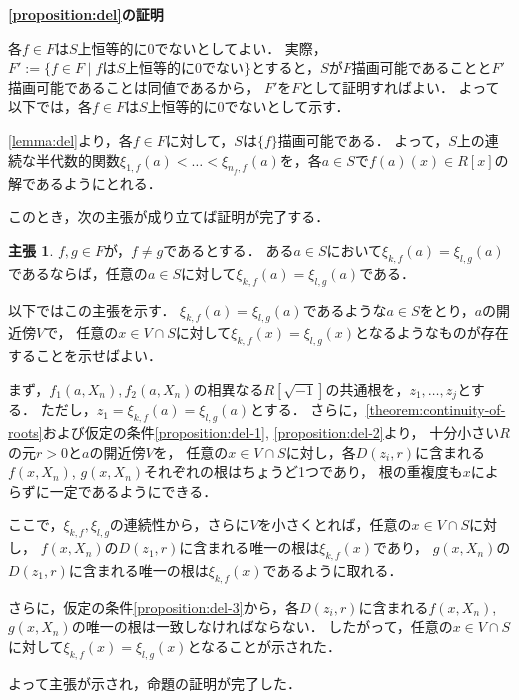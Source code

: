 \documentclass[uplatex, dvipdfmx]{jsarticle}
\makeatletter
\numberwithin{equation}{section}
\renewenvironment{proof}[1][\proofname]{\par
  \pushQED{\qed}%
  \normalfont \topsep6\p@\@plus6\p@\relax
  \trivlist
  \item\relax
  {\bfseries
  #1\@addpunct{.}}\hspace\labelsep\ignorespaces
}{
  \popQED\endtrivlist\@endpefalse
}
\theoremstyle{definition}
\newtheorem*{claim*}{主張}
\renewcommand{\proofname}{\textbf{証明}}
\makeatother
\begin{document}
\begin{proof}[{\bf \cref{proposition:del}の証明}]
     各$f \in F$は$S$上恒等的に$0$でないとしてよい．
     実際，$F' := \{f \in F \mid \text{$f$は$S$上恒等的に$0$でない}\}$とすると，$S$が$F$描画可能であることと$F'$描画可能であることは同値であるから，
     $F'$を$F$として証明すればよい．
     よって以下では，各$f \in F$は$S$上恒等的に$0$でないとして示す．

     \cref{lemma:del}より，各$f \in F$に対して，$S$は$\{f\}$描画可能である．
     よって，$S$上の連続な半代数的関数$\xi_{1,f}(a) < \dots < \xi_{n_f, f}(a)$を，各$a \in S$で$f(a)(x) \in R[x]$の解であるようにとれる．

     このとき，次の主張が成り立てば証明が完了する．

     \begin{claim*}
          $f, g \in F$が，$f \neq g$であるとする．
          ある$a \in S$において$\xi_{k,f}(a) = \xi_{l,g}(a)$であるならば，任意の$a \in S$に対して$\xi_{k,f}(a) = \xi_{l,g}(a)$である．
     \end{claim*}

     以下ではこの主張を示す．
     $\xi_{k,f}(a) = \xi_{l, g}(a)$であるような$a \in S$をとり，$a$の開近傍$V$で，
     任意の$x \in V \cap S$に対して$\xi_{k,f}(x) = \xi_{l,g}(x)$となるようなものが存在することを示せばよい．

     まず，$f_1(a, X_n), f_2(a, X_n)$の相異なる$R\left[\sqrt{-1}\right]$の共通根を，$z_1, \dots, z_j$とする．
     ただし，$z_1 = \xi_{k,f}(a)=\xi_{l,g}(a)$とする．
     さらに，\cref{theorem:continuity-of-roots}および仮定の条件\ref{proposition:del-1}, \ref{proposition:del-2}より，
     十分小さい$R$の元$r>0$と$a$の開近傍$V$を，
     任意の$x \in V \cap S$に対し，各$D(z_i, r)$に含まれる$f(x, X_n)$, $g(x, X_n)$それぞれの根はちょうど1つであり，
     根の重複度も$x$によらずに一定であるようにできる．

     ここで，$\xi_{k,f}, \xi_{l, g}$の連続性から，さらに$V$を小さくとれば，任意の$x \in V \cap S$に対し，
     $f(x, X_n)$の$D(z_1, r)$に含まれる唯一の根は$\xi_{k,f}(x)$であり，
     $g(x, X_n)$の$D(z_1, r)$に含まれる唯一の根は$\xi_{k,f}(x)$であるように取れる．

     さらに，仮定の条件\ref{proposition:del-3}から，各$D(z_i, r)$に含まれる$f(x, X_n)$, $g(x, X_n)$の唯一の根は一致しなければならない．
     したがって，任意の$x \in V \cap S$に対して$\xi_{k, f}(x) = \xi_{l, g}(x)$となることが示された．

     よって主張が示され，命題の証明が完了した．
\end{proof}
\end{document}
